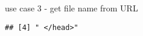 \documentclass[ignorenonframetext,]{beamer}
\begin{document}
\begin{frame}[fragile]{use case 3 - get file name from URL}
\begin{verbatim}
## [4] " </head>"                                                                                                                                                                                                                                                                                                                                                                                                                                                                                                                                                                                                                                                                                                                                                                                                                                                                                                                                                                                                                                                                                                                                                                                                                                                                                                                                                                                                                                                                                                                                                                                                                                                                                                                                                                                                                                                                                                                                                                                                                                                      

\end{verbatim}
\end{frame}
\end{document}
